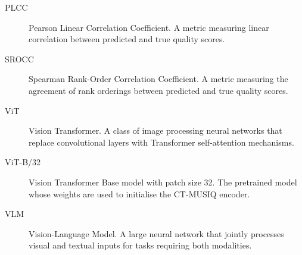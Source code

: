 \begin{description}
    \item[PLCC] Pearson Linear Correlation Coefficient. A metric measuring linear
    correlation between predicted and true quality scores.

    \item[SROCC] Spearman Rank-Order Correlation Coefficient. A metric measuring
    the agreement of rank orderings between predicted and true quality scores.

    \item[ViT] Vision Transformer. A class of image processing neural networks that
    replace convolutional layers with Transformer self-attention mechanisms.

    \item[ViT-B/32] Vision Transformer Base model with patch size 32. The pretrained
    model whose weights are used to initialise the CT-MUSIQ encoder.

    \item[VLM] Vision-Language Model. A large neural network that jointly processes
    visual and textual inputs for tasks requiring both modalities.
\end{description}
